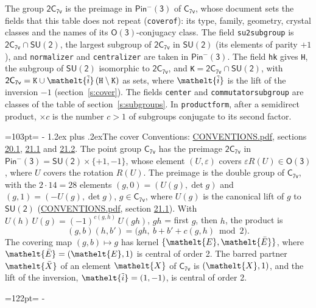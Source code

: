 \documentclass[10pt,a4paper]{article}
\makeatletter
\renewcommand\section{\@startsection{section}{1}{\z@}{-3ex plus -1ex minus -.2ex}%
  {1.2ex plus .2ex}{\normalfont\large\sffamily\bfseries\color{parttitle}}}
\newcommand{\needspace}[1]{\par\penalty-100\begingroup\dimen0=#1\relax\dimen2=\pagegoal
  \advance\dimen2-\pagetotal\ifdim\dimen0>\dimen2\relax\ifdim\dimen2>0pt\vfil\break\fi\fi
  \endgroup}
\numberwithin{equation}{section}
\newcommand{\eltfont}[1]{{\let\sigma\eltsigma\mathelt{#1}}}
\newcommand{\grp}[1]{\mathsf{#1}}
\newcommand{\elt}[1]{\eltfont{#1}}
\newcommand{\dirprod}{\times}
\newcommand{\barred}[1]{\bar{#1}}
\newcommand{\lift}[1]{\tilde{#1}}
\makeatother
\begin{document}
\leavevmode\label{n:element.inversion}\label{n:group.preimage}The group $\grp{2C_{7v}}$ is the preimage in $\grp{Pin^{-}(3)}$ of \href{../../../rotation/data/pdf/C7v.pdf}{$\grp{C_{7v}}$}, whose document sets the fields that this table does not repeat (\texttt{coverof}): its type, family, geometry, crystal classes and the names of its \href{../../../rotation/data/pdf/O3.pdf}{$\grp{O(3)}$}-conjugacy class. The field \texttt{su2subgroup} is $\grp{2C_{7v}} \cap \grp{SU(2)}$, the largest subgroup of $\grp{2C_{7v}}$ in $\grp{SU(2)}$ (its elements of parity $+1$), and \texttt{normalizer} and \texttt{centralizer} are taken in $\grp{Pin^{-}(3)}$. The field \texttt{hk} gives \texttt{H}, the subgroup of $\grp{SU(2)}$ isomorphic to $\grp{2C_{7v}}$, and \texttt{K}${} = \grp{2C_{7v}} \cap \grp{SU(2)}$, with $\grp{2C_{7v}} = \texttt{K} \cup \elt{\lift{i}}\,(\texttt{H} \setminus \texttt{K})$ as sets, where $\elt{\lift{i}}$ is the lift of the inversion $-1$ (section~\ref{s:cover}). The fields \texttt{center} and \texttt{commutatorsubgroup} are classes of the table of section~\ref{s:subgroups}.
\leavevmode\label{n:index.conjugates.c}In \texttt{productform}, after a semidirect product, ${\times}c$ is the number $c > 1$ of subgroups conjugate to its second factor.
\needspace{103pt}
\section{The cover}\label{s:cover}
Conventions: \href{../../CONVENTIONS.pdf}{CONVENTIONS.pdf}, sections \href{../../CONVENTIONS.pdf\#conv.20.1}{20.1}, \href{../../CONVENTIONS.pdf\#conv.21.1}{21.1} and \href{../../CONVENTIONS.pdf\#conv.21.2}{21.2}.
\leavevmode\label{n:group.pin.minus}\label{n:group.su2}\label{n:local.pin.sign}\label{n:matrix.covered}\label{n:matrix.lift.su2}\label{n:index.bar}The point group $\grp{C_{7v}}$ has the preimage $\grp{2C_{7v}}$ in $\grp{Pin^{-}(3)} = \grp{SU(2)} \dirprod \{+1, -1\}$, whose element $(U, \varepsilon)$ covers $\varepsilon R(U) \in \grp{O(3)}$, where $U$ covers the rotation $R(U)$. The preimage is the double group of $\grp{C_{7v}}$, with the $2 \cdot 14 = 28$ elements $(g, 0) = (U(g), \det g)$ and $(g, 1) = (-U(g), \det g)$, $g \in \grp{C_{7v}}$, where $U(g)$ is the canonical lift of $g$ to $\grp{SU(2)}$ (\href{../../CONVENTIONS.pdf}{CONVENTIONS.pdf}, section \href{../../CONVENTIONS.pdf\#conv.21.1}{21.1}). \label{n:function.cocycle}With $U(h)\,U(g) = (-1)^{c(g,h)}\,U(gh)$, $gh$ = first $g$, then $h$, the product is
\begin{equation}\label{e:product}(g, b)(h, b') = \bigl(gh,\ b + b' + c(g, h) \bmod 2\bigr).\end{equation}
\leavevmode\label{n:mark.bar}The covering map $(g, b) \mapsto g$ has kernel $\{\elt{E}, \elt{\barred{E}}\}$, where $\elt{\barred{E}} = (\elt{E}, 1)$ is central of order 2. \label{n:element.named}\label{n:mark.lift}The barred partner $\elt{\barred{X}}$ of an element $\elt{X}$ of $\grp{C_{7v}}$ is $(\elt{X}, 1)$, and the lift of the inversion, $\elt{\lift{i}} = (1, -1)$, is central of order 2.
\needspace{122pt}
\end{document}
